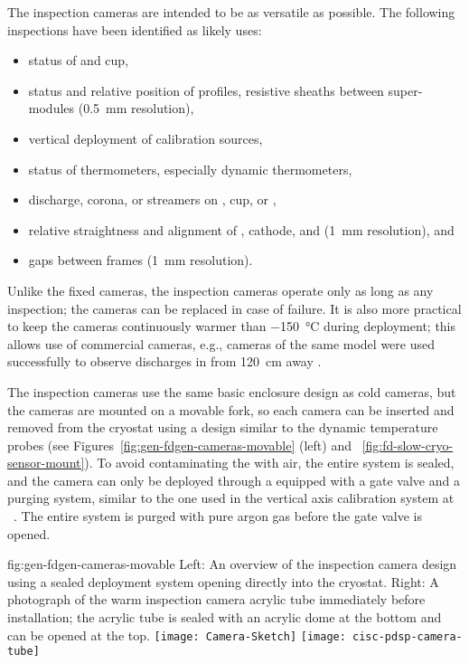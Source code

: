 The inspection cameras are intended to be as versatile as possible.
The following %
inspections have been identified as likely uses:
\begin{itemize}
\item status of  \fdth and cup,
\item status and relative position of  profiles, resistive sheaths between  super-modules (\SI{0.5}{mm} resolution),
\item vertical deployment of calibration sources,
\item status of thermometers, especially dynamic thermometers,
\item {} discharge, corona, or streamers on  \fdth, cup, or ,
\item relative straightness and alignment of , cathode, and  (\SI{1}{mm} resolution), and
\item gaps between  frames (\SI{1}{mm} resolution).
\end{itemize}

Unlike the fixed cameras, the inspection cameras operate only as
long as any inspection; the cameras can be replaced in case of failure.  It
is also more practical to keep the cameras continuously warmer than
 \SI{-150}{\celsius} during deployment; this allows use of  %
commercial cameras, %
e.g., cameras of the same model were used successfully to observe discharges
in  from \SI{120}{cm} away \cite{Auger:2015xlo}.


The inspection cameras use the same basic
enclosure design as cold cameras, but the cameras are mounted on a movable
fork, so each camera can be inserted and removed from the cryostat
using a design similar to the dynamic temperature probes (see
 Figures~\ref{fig:gen-fdgen-cameras-movable} (left) and
 ~\ref{fig:fd-slow-cryo-sensor-mount}).  To avoid contaminating the
\lar with air, the entire system is sealed, and the
camera can only be deployed through a \fdth equipped with a gate
valve and a purging system, similar to the one used in the vertical axis
calibration system at \kamland~\cite{Banks:2014hra}. The entire system
is  purged with pure argon gas before the gate valve is opened.

\begin{dunefigure}{fig:gen-fdgen-cameras-movable}
  {Left: An overview of the inspection camera design using a sealed deployment system opening directly into the cryostat. Right: A photograph of the  warm inspection camera acrylic tube immediately before installation; the acrylic tube is sealed with an acrylic dome at the bottom and can be opened at the top.}
  \texttt{[image: Camera-Sketch]}%
  \texttt{[image: cisc-pdsp-camera-tube]}%
\end{dunefigure}

